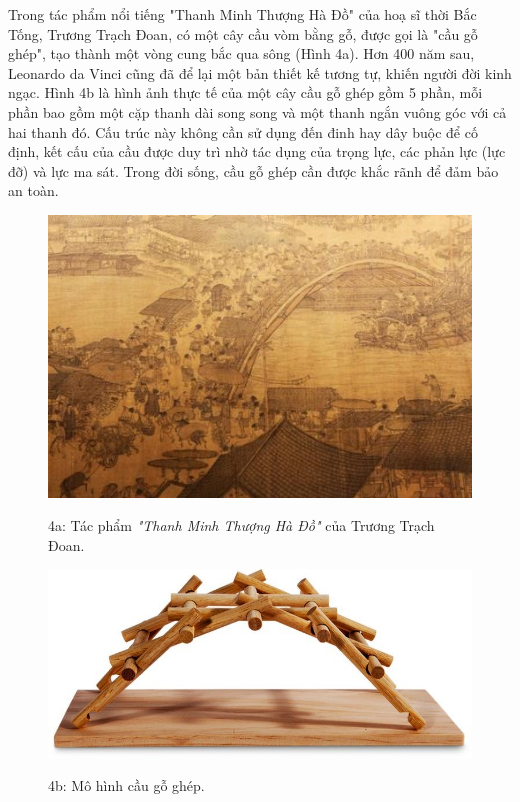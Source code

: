 \noindent Trong tác phẩm nổi tiếng "Thanh Minh Thượng Hà Đồ" của hoạ sĩ thời Bắc Tống, Trương Trạch Đoan, có một cây cầu vòm bằng gỗ, được gọi là "cầu gỗ ghép", tạo thành một vòng cung bắc qua sông (Hình 4a). Hơn 400 năm sau, Leonardo da Vinci cũng đã để lại một bản thiết kế tương tự, khiến người đời kinh ngạc. Hình 4b là hình ảnh thực tế của một cây cầu gỗ ghép gồm 5 phần, mỗi phần bao gồm một cặp thanh dài song song và một thanh ngắn vuông góc với cả hai thanh đó. Cấu trúc này không cần sử dụng đến đinh hay dây buộc để cố định, kết cấu của cầu được duy trì nhờ tác dụng của trọng lực, các phản lực (lực đỡ) và lực ma sát. Trong đời sống, cầu gỗ ghép cần được khắc rãnh để đảm bảo an toàn.\\
\begin{figure}[h]
  \centering
  \begin{minipage}{6cm}
    \centering
    \includegraphics[width=1.1\textwidth]{images/Hinh 4a.jpg}
    \begin{center}
      \figurename{ 4a: Tác phẩm \textit{"Thanh Minh Thượng Hà Đồ"} của Trương Trạch Đoan.}
    \end{center}
  \end{minipage}
  \hfil
  \begin{minipage}{6cm}
    \centering
    \includegraphics[width=1.3\textwidth]{images/Hinh 4b.jpg}
    \begin{center}
      \figurename{ 4b: Mô hình cầu gỗ ghép.}
    \end{center}
  \end{minipage}
\end{figure}

